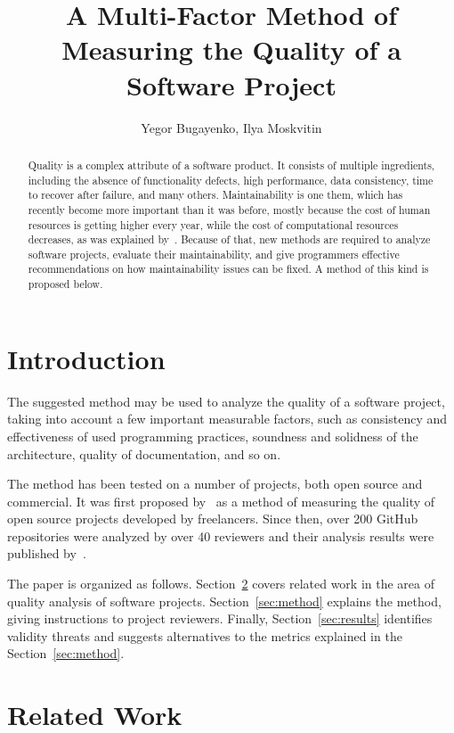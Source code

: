 \documentclass[12pt,oneside]{article}
\title{A Multi-Factor Method of Measuring the Quality of a Software Project}
\author{Yegor Bugayenko, Ilya Moskvitin}
\begin{document}
\raggedbottom
\setlength{\topskip}{6pt}
\setlength{\parindent}{0pt} %
\setlength{\parskip}{6pt} %

\maketitle

\begin{abstract}
Quality is a complex attribute of a software product. It consists of
multiple ingredients, including the absence of functionality defects,
high performance, data consistency, time to recover after failure, and
many others. Maintainability is one them, which has recently become
more important than it was before, mostly because the cost of
human resources is getting higher every year, while the cost of
computational resources decreases, as was explained by~\citet{yb-hacking}.
Because of that, new methods are required to analyze software projects, evaluate their
maintainability, and give programmers effective recommendations on
how maintainability issues can be fixed. A method of this kind is proposed
below.
\end{abstract}
\section{Introduction}

The suggested method may be used to analyze the quality
of a software project, taking into account a few important
measurable factors, such as consistency and effectiveness of
used programming practices, soundness and solidness of the
architecture, quality of documentation, and so on.\par
The method has been tested on a number of projects, both
open source and commercial. It was first proposed by~\citet{yb-sins}
as a method of measuring the quality of open source projects developed
by freelancers. Since then, over 200 GitHub repositories were
analyzed by over 40 reviewers and their analysis results were published
by~\citet{yb-award}.\par
The paper is organized as follows.
Section~\ref{sec:related} covers related work in the area of quality analysis of software projects.
Section~\ref{sec:method} explains the method, giving instructions to project reviewers.
Finally, Section~\ref{sec:results} identifies validity threats and suggests alternatives to the metrics explained in the Section~\ref{sec:method}.

\section{Related Work}
\label{sec:related}
\end{document}
